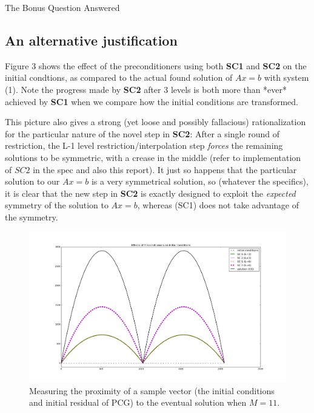 \documentclass[10pt]{article}
\theoremstyle{definition}
\begin{document}
\begin{section}{The Bonus Question Answered}
\subsection{An alternative justification}
Figure 3 shows the effect of the preconditioners using both \textbf{SC1} and \textbf{SC2} on the initial condtions, as compared to the actual found solution of $Ax=b$ with system (1). Note the progress made by \textbf{SC2} after 3 levels is both more than *ever* achieved by \textbf{SC1} when we compare how the initial conditions are transformed.

This picture also gives a strong (yet loose and possibly fallacious) rationalization for the particular nature of the novel step in \textbf{SC2}: After a single round of restriction, the L-1 level restriction/interpolation step \textit{forces} the remaining solutions to be symmetric, with a crease in the middle (refer to implementation of $SC2$ in the spec and also this report). It just so happens that the particular solution to our $Ax=b$ is a very symmetrical solution, so (whatever the specifics), it is clear that the new step in \textbf{SC2} is exactly designed to exploit the \textit{expected} symmetry of the solution to $Ax=b$, whereas (SC1) does not take advantage of the symmetry.
\begin{figure}[h]
\begin{center}
\includegraphics[width=\linewidth]{minv.png}
\caption{Measuring the proximity of a sample vector (the initial conditions and initial residual of PCG) to the eventual solution when $M=11$.}
\end{center}
\end{figure}
\end{section}
\end{document}
